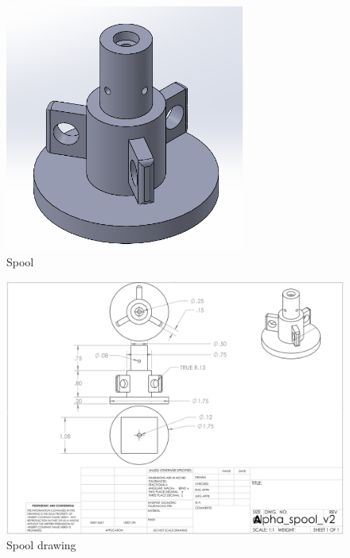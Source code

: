 \begin{figure}[H]
    \centering
    \includegraphics[width=0.7\textwidth]{src/figs/cad-and-dwgs/spool-cad.png}
    \caption{Spool}
    \label{cad:spool}
\end{figure}

\begin{figure}[H]
    \centering
    \includegraphics[width=\textwidth]{src/figs/cad-and-dwgs/spool_dwg.png}
    \caption{Spool drawing}
    \label{cad:spool:dwg}
\end{figure}



